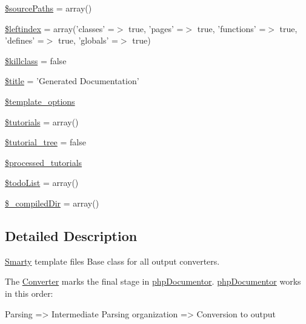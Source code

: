 \begin{DoxyCompactItemize}
\hyperlink{class_converter_acd2528ea280de1205493ed612957c799}{\$source\-Paths} = array()
\item 
\hyperlink{class_converter_ab49669c749559bb7833762878adb8f0c}{\$leftindex} = array('classes' =$>$ true, 'pages' =$>$ true, 'functions' =$>$ true, 'defines' =$>$ true, 'globals' =$>$ true)
\item 
\hyperlink{class_converter_a67455ac1c751cd5e5b977f7153c037fa}{\$killclass} = false
\item 
\hyperlink{class_converter_ada57e7bb7c152edad18fe2f166188691}{\$title} = '\-Generated \-Documentation'
\item 
\hyperlink{class_converter_a9e8e3182b20bb595bfe9186d97b57bb2}{\$template\-\_\-options}
\item 
\hyperlink{class_converter_a0a2a671833630e9d417f84cbb2b1eff1}{\$tutorials} = array()
\item 
\hyperlink{class_converter_a600397e42df2a02557437cf901638370}{\$tutorial\-\_\-tree} = false
\item 
\hyperlink{class_converter_a415f66dd0ac17505eb89ea7f80de7217}{\$processed\-\_\-tutorials}
\item 
\hyperlink{class_converter_a007be5d771c8611589ff85f6d795d408}{\$todo\-List} = array()
\item 
\hyperlink{class_converter_a5aad015a445fe38f98b819e074a79299}{\$\-\_\-compiled\-Dir} = array()
\end{DoxyCompactItemize}


\subsection{\-Detailed \-Description}
\hyperlink{class_smarty}{\-Smarty} template files \-Base class for all output converters.

\-The \hyperlink{class_converter}{\-Converter} marks the final stage in \hyperlink{namespacephp_documentor}{php\-Documentor}. \hyperlink{namespacephp_documentor}{php\-Documentor} works in this order\-:


\begin{DoxyPre}Parsing => Intermediate Parsing organization => Conversion to output\end{DoxyPre}


